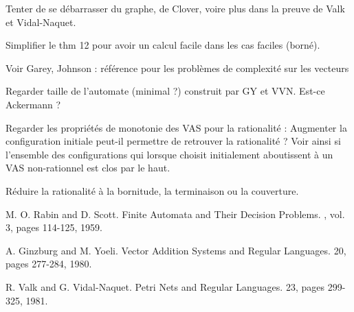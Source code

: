 \documentclass[a4paper,final]{article}
\theoremstyle{definition}
\begin{document}
Tenter de se débarrasser du graphe, de Clover, voire plus dans la preuve de Valk et Vidal-Naquet.

Simplifier le thm 12 pour avoir un calcul facile dans les cas faciles (borné).

Voir Garey, Johnson : référence pour les problèmes de complexité sur les vecteurs

Regarder taille de l'automate (minimal ?) construit par GY et VVN. Est-ce Ackermann ?

Regarder les propriétés de monotonie des VAS pour la rationalité : 
Augmenter la configuration initiale peut-il permettre de retrouver la rationalité ?
Voir ainsi si l'ensemble des configurations qui lorsque choisit initialement aboutissent à un VAS non-rationnel est clos par le haut.

Réduire la rationalité à la bornitude, la terminaison ou la couverture.


\begin{thebibliography}{10}

M. O. Rabin and D. Scott.
\newblock Finite Automata and Their Decision Problems.
, vol. 3, pages 114-125, 1959.

A. Ginzburg and M. Yoeli.
\newblock Vector Addition Systems and Regular Languages.
 20, pages 277-284, 1980.

R. Valk and G. Vidal-Naquet.
\newblock Petri Nets and Regular Languages.
 23, pages 299-325, 1981.

\end{thebibliography}
\end{document}

